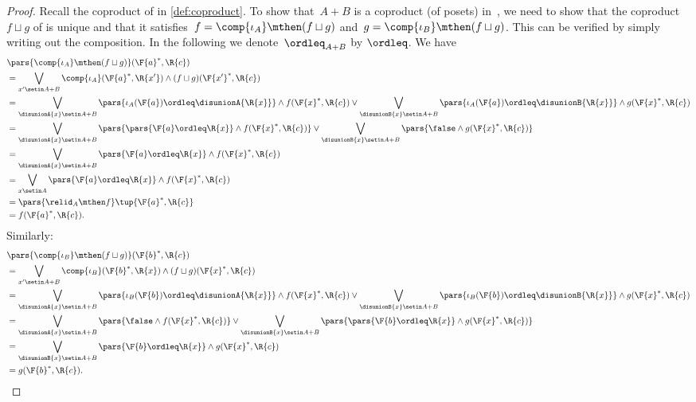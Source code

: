 \begin{proof}
    Recall the coproduct of  in \cref{def:coproduct}.
    To show that~$A+B$ is a coproduct (of posets) in~\DP, we need to show that the coproduct~$f \sqcup g$ of  is unique and that it satisfies~$f = \comp{\iota_A} \mthen (f \sqcup g)$ and~$g = \comp{\iota_B} \mthen (f \sqcup g)$.
    This can be verified by simply writing out the composition.
    In the following we denote~$\ordleq_{A+B}$ by $\ordleq$.
    We have
    \begin{equation}
        \begin{aligned}
             & \pars{\comp{\iota_A}\mthen (f\sqcup g)}(\F{a}^*,\R{c}) \\&=\bigvee_{x' \setin A+B}\comp{\iota_A}(\F{a}^*,\R{x'})\wedge (f\sqcup g)(\F{x'}^*,\R{c})\\
             & =\bigvee_{\disunionA{x} \setin A+B}
            \pars{\iota_A(\F{a})\ordleq\disunionA{\R{x}}}\wedge f(\F{x}^*,\R{c}) \vee \bigvee_{\disunionB{x} \setin A+B}
            \pars{\iota_A(\F{a})\ordleq \disunionB{\R{x}}}\wedge g(\F{x}^*,\R{c}) \\
             & =\bigvee_{\disunionA{x} \setin A+B}
            \pars{ \pars{\F{a}\ordleq \R{x}} \wedge f(\F{x}^*,\R{c})} \vee \bigvee_{\disunionB{x} \setin A+B}
            \pars{ \false \wedge g(\F{x}^*,\R{c}) } \\
             & =\bigvee_{\disunionA{x} \setin A+B} \pars{\F{a}\ordleq \R{x}} \wedge f(\F{x}^*,\R{c}) \\
             & =\bigvee_{x\setin A}\pars{ \F{a}\ordleq \R{x}} \wedge f(\F{x}^*,\R{c}) \\
             & =\pars{ \relid_A \mthen f}\tup{\F{a}^*,\R{c}} \\
             & =f(\F{a}^*,\R{c}).
        \end{aligned}
    \end{equation}
    Similarly:
    \begin{equation}
        \begin{aligned}
             & \pars{\comp{\iota_B}\mthen (f\sqcup g)}(\F{b}^*,\R{c}) \\&=\bigvee_{x' \setin A+B}\comp{\iota_B}(\F{b}^*,\R{x})\wedge (f\sqcup g)(\F{x}^*,\R{c})\\
             & =\bigvee_{\disunionA{x} \setin A+B}
            \pars{\iota_B(\F{b})\ordleq\disunionA{\R{x}}}\wedge f(\F{x}^*,\R{c}) \vee \bigvee_{\disunionB{x} \setin A+B}
            \pars{\iota_B(\F{b})\ordleq \disunionB{\R{x}}}\wedge g(\F{x}^*,\R{c}) \\
             & =\bigvee_{\disunionA{x} \setin A+B}
            \pars{\false \wedge f(\F{x}^*,\R{c})} \vee \bigvee_{\disunionB{x} \setin A+B}
            \pars{\pars{\F{b}\ordleq \R{x}} \wedge g(\F{x}^*,\R{c}) } \\
             & =\bigvee_{\disunionB{x} \setin A+B} \pars{\F{b}\ordleq \R{x}} \wedge g(\F{x}^*,\R{c}) \\
             & =g(\F{b}^*,\R{c}).
        \end{aligned}
    \end{equation}


\end{proof}
